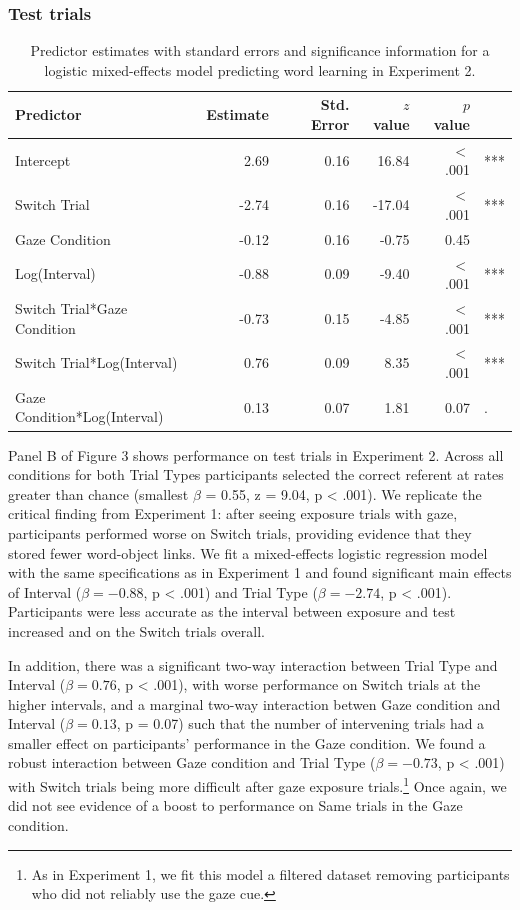 \documentclass[authoryear, review]{elsarticle}
\begin{document}
\subsubsection{Test trials}\label{test-trials-1}

\begin{table}[tb]
\centering
\begin{tabular}{lrrrrl}
 Predictor & Estimate & Std. Error & $z$ value & $p$ value &  \\ 
  \hline
Intercept & 2.69 & 0.16 & 16.84 & $<$ .001 & *** \\ 
  Switch Trial & -2.74 & 0.16 & -17.04 & $<$ .001 & *** \\ 
  Gaze Condition & -0.12 & 0.16 & -0.75 & 0.45 &  \\ 
  Log(Interval) & -0.88 & 0.09 & -9.40 & $<$ .001 & *** \\ 
  Switch Trial*Gaze Condition & -0.73 & 0.15 & -4.85 & $<$ .001 & *** \\ 
  Switch Trial*Log(Interval) & 0.76 & 0.09 & 8.35 & $<$ .001 & *** \\ 
  Gaze Condition*Log(Interval) & 0.13 & 0.07 & 1.81 & 0.07 & . \\ 
   \hline
\end{tabular}
\caption{Predictor estimates with standard errors and significance information for a logistic mixed-effects model predicting word learning in Experiment 2.} 
\label{tab:exp2_reg}
\end{table}

Panel B of Figure 3 shows performance on test trials in Experiment 2.
Across all conditions for both Trial Types participants selected the
correct referent at rates greater than chance (smallest \(\beta\) =
0.55, z = 9.04, p \textless{} .001). We replicate the critical finding
from Experiment 1: after seeing exposure trials with gaze, participants
performed worse on Switch trials, providing evidence that they stored
fewer word-object links. We fit a mixed-effects logistic regression
model with the same specifications as in Experiment 1 and found
significant main effects of Interval (\(\beta = -0.88\), p \textless{}
.001) and Trial Type (\(\beta = -2.74\), p \textless{} .001).
Participants were less accurate as the interval between exposure and
test increased and on the Switch trials overall.

In addition, there was a significant two-way interaction between Trial
Type and Interval (\(\beta = 0.76\), p \textless{} .001), with worse
performance on Switch trials at the higher intervals, and a marginal
two-way interaction betwen Gaze condition and Interval
(\(\beta = 0.13\), p = 0.07) such that the number of intervening trials
had a smaller effect on participants' performance in the Gaze condition.
We found a robust interaction between Gaze condition and Trial Type
(\(\beta = -0.73\), p \textless{} .001) with Switch trials being more
difficult after gaze exposure
trials.\footnote{As in Experiment 1, we fit this model a filtered dataset removing participants who did not reliably use the gaze cue.}
Once again, we did not see evidence of a boost to performance on Same
trials in the Gaze condition.
\end{document}
